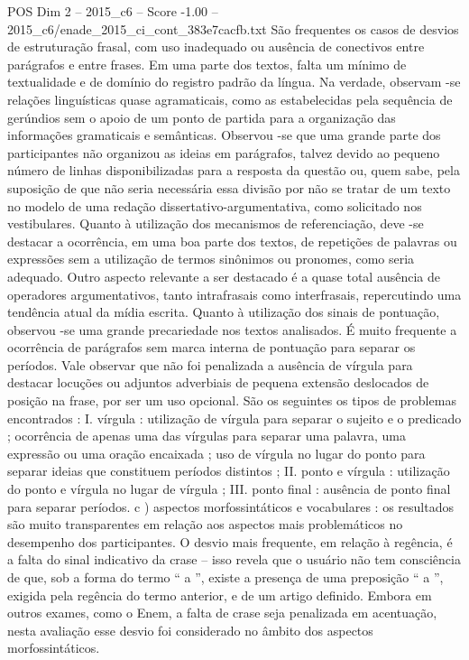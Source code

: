 \begin{textsample}{POS Dim 2 – 2015\_c6 – Score -1.00 – 2015\_c6/enade\_2015\_ci\_cont\_383e7cacfb.txt}
São frequentes os casos de desvios de estruturação frasal, com uso inadequado ou ausência de conectivos entre parágrafos e entre frases.
Em uma parte dos textos, falta um mínimo de textualidade e de domínio do registro padrão da língua.
Na verdade, observam -se relações linguísticas quase agramaticais, como as estabelecidas pela sequência de gerúndios sem o apoio de um ponto de partida para a organização das informações gramaticais e semânticas.
Observou -se que uma grande parte dos participantes não organizou as ideias em parágrafos, talvez devido ao pequeno número de linhas disponibilizadas para a resposta da questão ou, quem sabe, pela suposição de que não seria necessária essa divisão por não se tratar de um texto no modelo de uma redação dissertativo-argumentativa, como solicitado nos vestibulares.
Quanto à utilização dos mecanismos de referenciação, deve -se destacar a ocorrência, em uma boa parte dos textos, de repetições de palavras ou expressões sem a utilização de termos sinônimos ou pronomes, como seria adequado.
Outro aspecto relevante a ser destacado é a quase total ausência de operadores argumentativos, tanto intrafrasais como interfrasais, repercutindo uma tendência atual da mídia escrita.
Quanto à utilização dos sinais de pontuação, observou -se uma grande precariedade nos textos analisados.
É muito frequente a ocorrência de parágrafos sem marca interna de pontuação para separar os períodos.
Vale observar que não foi penalizada a ausência de vírgula para destacar locuções ou adjuntos adverbiais de pequena extensão deslocados de posição na frase, por ser um uso opcional.
São os seguintes os tipos de problemas encontrados : I. vírgula : utilização de vírgula para separar o sujeito e o predicado ; ocorrência de apenas uma das vírgulas para separar uma palavra, uma expressão ou uma oração encaixada ; uso de vírgula no lugar do ponto para separar ideias que constituem períodos distintos ; II. ponto e vírgula : utilização do ponto e vírgula no lugar de vírgula ; III. ponto final : ausência de ponto final para separar períodos. c ) aspectos morfossintáticos e vocabulares : os resultados são muito transparentes em relação aos aspectos mais problemáticos no desempenho dos participantes.
O desvio mais frequente, em relação à regência, é a falta do sinal indicativo da crase – isso revela que o usuário não tem consciência de que, sob a forma do termo “ a ”, existe a presença de uma preposição “ a ”, exigida pela regência do termo anterior, e de um artigo definido.
Embora em outros exames, como o Enem, a falta de crase seja penalizada em acentuação, nesta avaliação esse desvio foi considerado no âmbito dos aspectos morfossintáticos.

\end{textsample}
